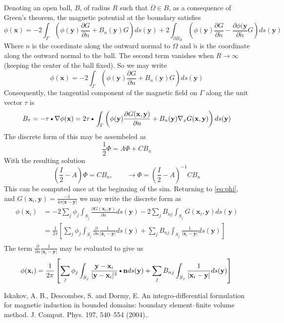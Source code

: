 \documentclass[11pt]{article}
\newcommand{\DOT}{\text{\textbullet}}
\newcommand{\X}{\mathbf{x}}
\newcommand{\Y}{\mathbf{y}}
\newcommand{\N}{\mathbf{n}}
\newcommand{\PD}{\partial}
\begin{document}
Denoting an open ball, $B$, of radius $R$ such that $\overline{\Omega}\in B$, as a consequence of Green's theorem, the magnetic potential at the boundary satisfies
\begin{equation}
  \phi(\X) = 
  -2 \int_{\Gamma} \left( \phi(\Y)
  \frac{\PD G}{\PD n} + B_n(\Y) G \right) ds(\Y)
  +2 \int_{\PD B_R} \left( \phi(\Y)
  \frac{\PD G}{\PD \tilde{n}} - \frac{\PD \phi(\Y}{\PD \tilde{n}} G \right) ds(\Y)
\end{equation}
Where $n$ is the coordinate along the outward normal to $\Omega$ and $\tilde{n}$ is the coordinate along the outward normal to the ball. The second term vanishes when $R\rightarrow \infty$ (keeping the center of the ball fixed). So we may write
\begin{equation} \label{eq:phi}
  \phi(\X) = 
  -2 \int_{\Gamma} \left( \phi(\Y)
  \frac{\PD G}{\PD n} + B_n(\Y) G \right) ds(\Y)
\end{equation}
Consequently, the tangential component of the magnetic field on $\Gamma$ along the unit vector $\tau$ is 
\begin{equation}
  B_{\tau} = - \mathbf{\tau} \DOT \nabla \phi(\X) = 
  2 \mathbf{\tau} \DOT
  \int_{\Gamma}
  \left(
  \phi(\Y) \frac{\PD G(\X,\Y)}{\PD n}
  + B_n(\Y) \nabla_x G(\X,\Y)
  \right) ds(\Y)
\end{equation}
The discrete form of this may be assembeled as 
\begin{equation}
  \frac{1}{2} \Phi = A \Phi + C B_n
\end{equation}
With the resulting solution
\begin{equation}
  \left(\frac{I}{2} - A\right)\Phi = C B_n, \qquad
  \rightarrow
  \Phi = \left(\frac{I}{2} - A\right)^{-1} C B_n
\end{equation}
This can be computed once at the beginning of the sim. Returning to \ref{eq:phi}, and $G(\X_i,\Y) = \frac{-1}{4\pi |\X - \Y|}$ we may write the discrete form as
\begin{equation}
\begin{split}
\phi(\X_i) & = -2 \sum_j \phi_j \int_{S_j} \frac{\PD G(\X_i,\Y)}{\PD n} ds(\Y)
           -2 \sum_j B_{nj} \int_{S_j} G(\X_i,\Y) ds(\Y) \\
       & = \frac{1}{2 \pi} 
       \left[
       \sum_j \phi_j \int_{S_j} \frac{\PD}{\PD n} \frac{1}{|\X_i-\Y|} ds(\Y)
     + \sum_j B_{nj} \int_{S_j} \frac{1}{|\X_i-\Y|} ds(\Y)
       \right] \\
\end{split}
\end{equation}
The term $\frac{\PD}{\PD n} \frac{1}{|\X_i-\Y|} $ may be evaluated to give us
\begin{equation}
\phi(\X_i) = \frac{1}{2 \pi} 
       \left[
       \sum_j \phi_j \int_{S_j} \frac{\Y - \X_i}{| \Y - \X_i|^3} \DOT \N ds(\Y)
     + \sum_j B_{nj} \int_{S_j} \frac{1}{|\X_i-\Y|} ds(\Y)
       \right] \\
\end{equation}

\begin{thebibliography}{1}
 Iskakov, A. B., Descombes, S. and Dormy, E. An integro-differential formulation for magnetic induction in bounded domains: boundary element–finite volume method. J. Comput. Phys. 197, 540–554 (2004)..
\end{thebibliography}
\end{document}
